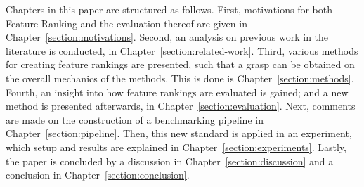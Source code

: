 \documentclass[../main.tex]{subfiles}
\begin{document}
Chapters in this paper are structured as follows. First, motivations for both Feature Ranking and the evaluation thereof are given in Chapter~\ref{section:motivations}. Second, an analysis on previous work in the literature is conducted, in Chapter~\ref{section:related-work}. Third, various methods for creating feature rankings are presented, such that a grasp can be obtained on the overall mechanics of the methods. This is done is Chapter~\ref{section:methods}. Fourth, an insight into how feature rankings are evaluated is gained; and a new method is presented afterwards, in Chapter~\ref{section:evaluation}. Next, comments are made on the construction of a benchmarking pipeline in Chapter~\ref{section:pipeline}. Then, this new standard is applied in an experiment, which setup and results are explained in Chapter~\ref{section:experiments}. Lastly, the paper is concluded by a discussion in Chapter~\ref{section:discussion} and a conclusion in Chapter~\ref{section:conclusion}.


\biblio
\end{document}
